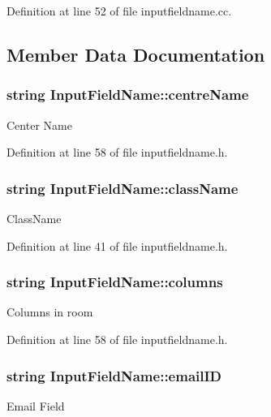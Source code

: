 Definition at line 52 of file inputfieldname.\-cc.



\subsection{Member Data Documentation}
\hypertarget{classInputFieldName_a19c67f2d38cde97f856d4ca3639f4fc7}{
\subsubsection[{centre\-Name}]{\setlength{\rightskip}{0pt plus 5cm}string Input\-Field\-Name\-::centre\-Name}}\label{classInputFieldName_a19c67f2d38cde97f856d4ca3639f4fc7}
Center Name 

Definition at line 58 of file inputfieldname.\-h.

\hypertarget{classInputFieldName_ad8b28ebeabdabb5967542e317f549280}{
\subsubsection[{class\-Name}]{\setlength{\rightskip}{0pt plus 5cm}string Input\-Field\-Name\-::class\-Name}}\label{classInputFieldName_ad8b28ebeabdabb5967542e317f549280}
Class\-Name 

Definition at line 41 of file inputfieldname.\-h.

\hypertarget{classInputFieldName_abca049f347e589f24b672c19907c5c72}{
\subsubsection[{columns}]{\setlength{\rightskip}{0pt plus 5cm}string Input\-Field\-Name\-::columns}}\label{classInputFieldName_abca049f347e589f24b672c19907c5c72}
Columns in room 

Definition at line 58 of file inputfieldname.\-h.

\hypertarget{classInputFieldName_a05541618feaaebe7a3f74b0bf8fa74b9}{
\subsubsection[{email\-I\-D}]{\setlength{\rightskip}{0pt plus 5cm}string Input\-Field\-Name\-::email\-I\-D}}\label{classInputFieldName_a05541618feaaebe7a3f74b0bf8fa74b9}
Email Field 


